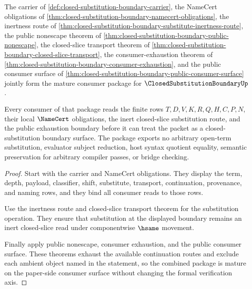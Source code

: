 \begin{theorem}
\label{thm:closed-substitution-boundary-mature-consumer-package}
The carrier of \autoref{def:closed-substitution-boundary-carrier}, the NameCert obligations of \autoref{thm:closed-substitution-boundary-namecert-obligations}, the inertness route of \autoref{thm:closed-substitution-boundary-substitute-inertness-route}, the public nonescape theorem of \autoref{thm:closed-substitution-boundary-public-nonescape}, the closed-slice transport theorem of \autoref{thm:closed-substitution-boundary-closed-slice-transport}, the consumer-exhaustion theorem of \autoref{thm:closed-substitution-boundary-consumer-exhaustion}, and the public consumer surface of \autoref{thm:closed-substitution-boundary-public-consumer-surface} jointly form the mature consumer package for $\ClosedSubstitutionBoundaryUp$.

Every consumer of that package reads the finite rows $T,D,V,K,R,Q,H,C,P,N$, their local $\NameCert$ obligations, the inert closed-slice substitution route, and the public exhaustion boundary before it can treat the packet as a closed-substitution boundary surface. The package exports no arbitrary open-term substitution, evaluator subject reduction, host syntax quotient equality, semantic preservation for arbitrary compiler passes, or bridge checking.
\end{theorem}
\begin{proof}
Start with the carrier and NameCert obligations. They display the term, depth, payload, classifier, shift, substitute, transport, continuation, provenance, and naming rows, and they bind all consumer reads to those rows.

Use the inertness route and closed-slice transport theorem for the substitution operation. They ensure that substitution at the displayed boundary remains an inert closed-slice read under componentwise $\hsame$ movement.

Finally apply public nonescape, consumer exhaustion, and the public consumer surface. These theorems exhaust the available continuation routes and exclude each ambient object named in the statement, so the combined package is mature on the paper-side consumer surface without changing the formal verification axis.
\end{proof}


